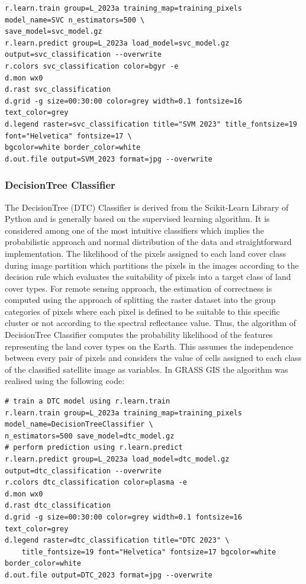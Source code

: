 \documentclass[preprint,12pt,authoryear]{elsarticle}
\begin{document}
\begin{footnotesize}
\begin{verbatim}
r.learn.train group=L_2023a training_map=training_pixels model_name=SVC n_estimators=500 \
save_model=svc_model.gz 
r.learn.predict group=L_2023a load_model=svc_model.gz output=svc_classification --overwrite
r.colors svc_classification color=bgyr -e
d.mon wx0
d.rast svc_classification
d.grid -g size=00:30:00 color=grey width=0.1 fontsize=16 text_color=grey
d.legend raster=svc_classification title="SVM 2023" title_fontsize=19 font="Helvetica" fontsize=17 \
bgcolor=white border_color=white
d.out.file output=SVM_2023 format=jpg --overwrite
\end{verbatim}
\end{footnotesize}

\subsubsection{DecisionTree Classifier}

The DecisionTree (DTC) Classifier is derived from the Scikit-Learn Library of Python and is generally based on the supervised learning algorithm. It is considered among one of the most intuitive classifiers which implies the probabilistic approach and normal distribution of the data and straightforward implementation. The likelihood of the pixels assigned to each land cover class during image partition which partitions the pixels in the images according to the decision rule which evaluates the suitability of pixels into a target class of land cover types. For remote sensing approach, the estimation of correctness is computed using the approach of splitting the raster dataset into the group categories of pixels where each pixel is defined to be suitable to this specific cluster or not according to the spectral reflectance value. Thus, the algorithm of DecisionTree Classifier computes the probability likelihood of the features representing the land cover types on the Earth. This assumes the independence between every pair of pixels and considers the value of cells assigned to each class of the classified satellite image as variables. In GRASS GIS the algorithm was realised using the following code:

\begin{footnotesize}
\begin{verbatim}
# train a DTC model using r.learn.train
r.learn.train group=L_2023a training_map=training_pixels model_name=DecisionTreeClassifier \
n_estimators=500 save_model=dtc_model.gz
# perform prediction using r.learn.predict
r.learn.predict group=L_2023a load_model=dtc_model.gz output=dtc_classification --overwrite
r.colors dtc_classification color=plasma -e
d.mon wx0
d.rast dtc_classification
d.grid -g size=00:30:00 color=grey width=0.1 fontsize=16 text_color=grey
d.legend raster=dtc_classification title="DTC 2023" \
	title_fontsize=19 font="Helvetica" fontsize=17 bgcolor=white border_color=white
d.out.file output=DTC_2023 format=jpg --overwrite
\end{verbatim}
\end{footnotesize}
\end{document}
